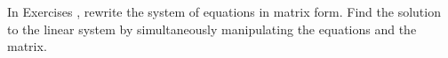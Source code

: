 {In Exercises}
{, rewrite the system of equations in matrix form. Find the solution to the linear system by simultaneously manipulating the equations and the matrix.}
